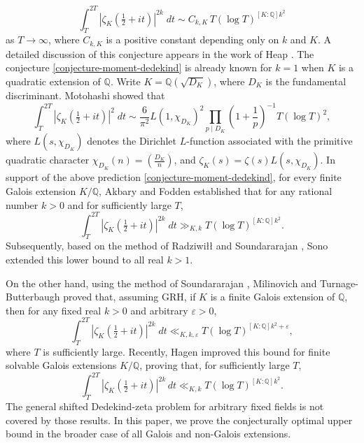 \documentclass[twoside,reqno,11pt,a4paper]{amsart}
\numberwithin{equation}{section}
\theoremstyle{plain}
\theoremstyle{definition}
\theoremstyle{remark}
\begin{document}
\begin{equation}\label{conjecture-moment-dedekind}
	\int_{T}^{2T}\left|\zeta_K\!\left(\tfrac12+it\right)\right|^{2k}\;dt
	\sim
	C_{k,K}\,T(\log T)^{[K:\mathbb{Q}]k^2}
\end{equation}
as $T\to\infty$, where $C_{k,K}$ is a positive constant depending only on $k$ and $K$. A detailed discussion of this conjecture appears in the work of Heap \cite{Heap1}. The conjecture \eqref{conjecture-moment-dedekind} is already known for $k=1$ when $K$ is a quadratic extension of $\mathbb{Q}$. Write $K=\mathbb{Q}(\sqrt{D_K})$, where $D_K$ is the fundamental discriminant. Motohashi \cite{Motohasi} showed that
\begin{equation*}
	\int_{T}^{2T} \left| \zeta_K\left(\tfrac{1}{2}+it\right)\right|^{2}\;dt
	\sim
	\frac{6}{\pi^2}L\left(1,\chi_{D_K}\right)^2
	\prod_{p\mid D_K}\left(1+\frac{1}{p}\right)^{-1}
	T(\log T)^{2},
\end{equation*}
where $L(s,\chi_{D_K})$ denotes the Dirichlet $L$-function associated with the primitive quadratic character $\chi_{D_K}(n)=\left(\frac{D_K}{n}\right)$, and $\zeta_K(s)=\zeta(s)L(s,\chi_{D_K})$. In support of the above prediction \eqref{conjecture-moment-dedekind}, for every finite Galois extension $K/\mathbb{Q}$, Akbary and Fodden \cite{Akbary-Fodden} established that for any rational number $k>0$ and for sufficiently large $T$,
	\begin{equation*}
			\int_{T}^{2T} \left| \zeta_K\!\left(\tfrac{1}{2}+it\right)\right|^{2k}\;dt 
		\gg_{K,k} T(\log T)^{[K:\mathbb{Q}]k^2}.
	\end{equation*}
	Subsequently, based on the method of Radziwi{\l}{\l} and Soundararajan \cite{Raziwill-Sound}, Sono \cite{K.Sono} extended this lower bound to all real $k>1$.

	On the other hand, using the method of Soundararajan \cite{Sound}, Milinovich and Turnage-Butterbaugh \cite{M-T} proved that, assuming GRH, if $K$ is a finite Galois extension of $\mathbb{Q}$, then for any fixed real $k>0$ and arbitrary $\varepsilon>0$,
	\begin{equation}\label{bound-milinovich-turnage}
		\int_{T}^{2T} \left| \zeta_K\!\left(\tfrac{1}{2}+it\right)\right|^{2k}\;dt 
		\ll_{K,k,\varepsilon} T(\log T)^{[K:\mathbb{Q}]k^2+\varepsilon},
	\end{equation}
where $T$ is sufficiently large.
Recently, Hagen \cite{Hagen} improved this bound for finite solvable Galois extensions $K/\mathbb{Q}$, proving that, for sufficiently large $T$,
\begin{equation*}
	\int_{T}^{2T} \left| \zeta_K\!\left(\tfrac{1}{2}+it\right)\right|^{2k}\,dt 
	\ll_{K,k} T(\log T)^{[K:\mathbb{Q}]k^2}.
\end{equation*}
The general shifted Dedekind-zeta problem for arbitrary fixed fields is not covered by those results. In this paper, we prove the conjecturally optimal upper bound in the broader case of all Galois and non-Galois extensions.
\end{document}
